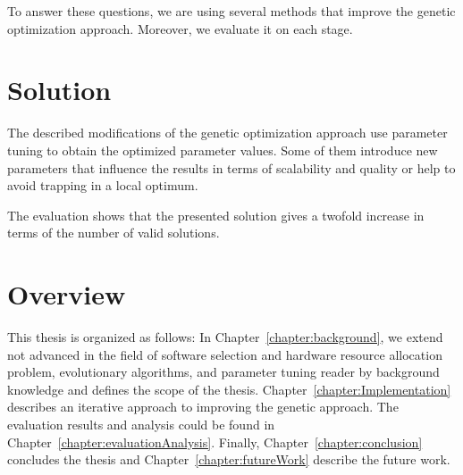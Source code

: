 To answer these questions, we are using several methods that improve the genetic optimization approach. Moreover, we evaluate it on each stage. 

\section{Solution}

The described modifications of the genetic optimization approach use parameter tuning to obtain the optimized parameter values. Some of them introduce new parameters that influence the results in terms of scalability and quality or help to avoid trapping in a local optimum.

The evaluation shows that the presented solution gives a twofold increase in terms of the number of valid solutions.


\section{Overview}
This thesis is organized as follows: In Chapter~\ref{chapter:background}, we extend not advanced in the field of software selection and hardware resource allocation problem, evolutionary algorithms, and parameter tuning reader by background knowledge and defines the scope of the thesis. Chapter~\ref{chapter:Implementation} describes an iterative approach to improving the genetic approach. The evaluation results and analysis could be found in Chapter~\ref{chapter:evaluationAnalysis}. Finally, Chapter~\ref{chapter:conclusion} concludes the thesis and Chapter~\ref{chapter:futureWork} describe the future work.

